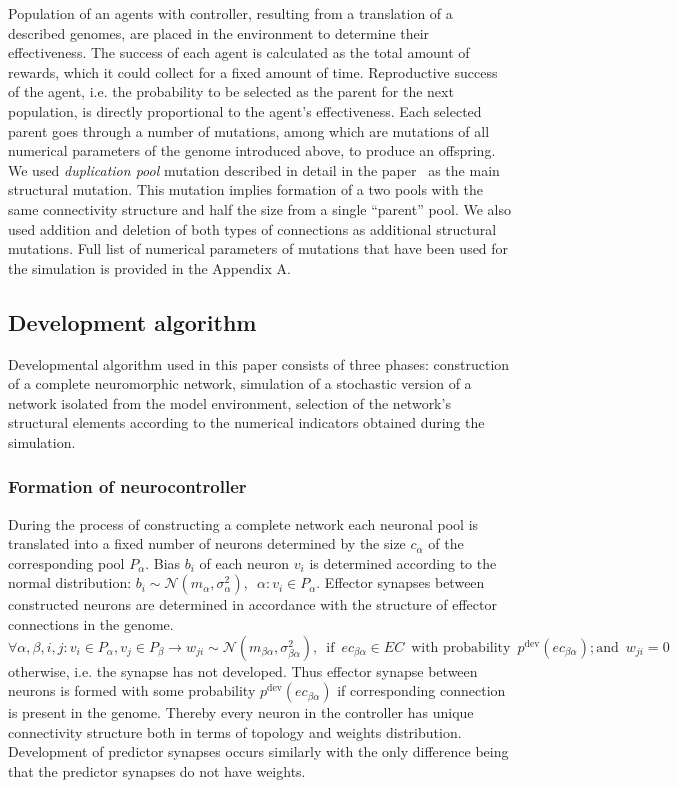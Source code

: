 \documentclass[letterpaper]{article}
\begin{document}
Population of an agents with controller, resulting from a translation of a described genomes, are placed in the environment to determine their effectiveness. The success of each agent is calculated as the total amount of rewards, which it could collect for a fixed amount of time. Reproductive success of the agent, i.e. the probability to be selected as the parent for the next population, is directly proportional to the agent's effectiveness. Each selected parent goes through a number of mutations, among which are mutations of all numerical parameters of the genome introduced above, to produce an offspring. We used {\em duplication pool} mutation described in detail in the paper~\citep{LakhmanBurtsev2013} as the main structural mutation. This mutation implies formation of a two pools with the same connectivity structure and half the size from a single ``parent'' pool. We also used addition and deletion of both types of connections as additional structural mutations. Full list of numerical parameters of mutations that have been used for the simulation is provided in the Appendix A.

\subsection{Development algorithm}

Developmental algorithm used in this paper consists of three phases: construction of a complete neuromorphic network, simulation of a stochastic version of a network isolated from the model environment, selection of the network's structural elements according to the numerical indicators obtained during the simulation.

\subsubsection{Formation of neurocontroller} During the process of constructing a complete network each neuronal pool is translated into a fixed number of neurons determined by the size $c_{\alpha}$ of the corresponding pool $P_{\alpha}$. Bias $b_{i}$ of each neuron $v_{i}$ is determined according to the normal distribution: $b_{i}\sim \mathcal{N} \left(m_{\alpha},\sigma^2_{\alpha}\right), \enspace \alpha : v_{i} \in P_{\alpha}$. Effector synapses between constructed neurons are determined in accordance with the structure of effector connections in the genome. $\forall \alpha, \beta, i, j : v_{i} \in P_{\alpha}, v_{j} \in P_{\beta} \rightarrow w_{ji} \sim \mathcal{N} \left(m_{\beta\alpha},\sigma^2_{\beta\alpha}\right),\enspace \mbox{if} \enspace ec_{\beta\alpha} \in EC \enspace \mbox{with probability} \enspace p^{\mathrm{dev}}\left(ec_{\beta\alpha}\right); \mbox{and} \enspace w_{ji} = 0$ otherwise, i.e. the synapse has not developed. Thus effector synapse between neurons is formed with some probability $p^{\mathrm{dev}}\left(ec_{\beta\alpha}\right)$ if corresponding connection is present in the genome. Thereby every neuron in the controller has unique connectivity structure both in terms of topology and weights distribution. Development of predictor synapses occurs similarly with the only difference being that the predictor synapses do not have weights.
\end{document}
